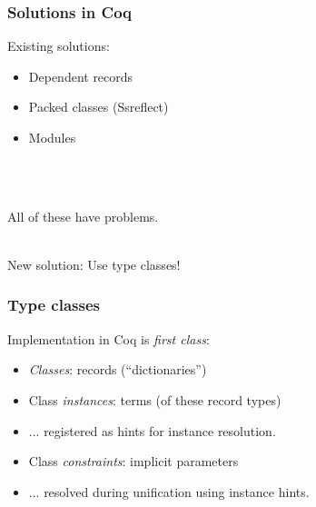 \documentclass{beamer}
\begin{document}
\begin{frame}
\frametitle{Solutions in Coq}
Existing solutions:
\begin{itemize}
\item Dependent records
\item Packed classes (Ssreflect)
\item Modules
\end{itemize}
\ \\
\ \\
\pause

All of these have problems.

\ \\
New solution: Use type classes!

\end{frame}

\begin{frame}
\frametitle{Type classes}

Implementation in Coq is \emph{first class}:
\begin{itemize}
\item \emph{Classes}: records (``dictionaries'')
\item Class \emph{instances}: terms (of these record types)
\item ... registered as hints for instance resolution.
\item Class \emph{constraints}: implicit parameters
\item ... resolved during unification using instance hints.
\end{itemize}

\end{frame}
\end{document}
